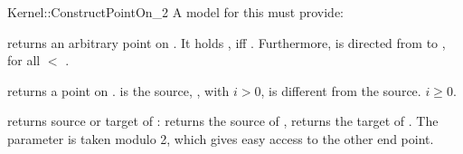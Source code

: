 \begin{ccRefFunctionObjectConcept}{Kernel::ConstructPointOn_2}
A model for this must provide:


       {returns an arbitrary point on . It holds 
        , iff .
        Furthermore,  is directed from 
        to , for all  $<$ .}

       {returns a point on .  is the source,
        , with $i>0$, is different from the 
        source. \ccPrecond $i \geq 0$.}

       {returns source or target   of :    returns
        the source of ,  returns the target of .
        The parameter  is taken modulo 2, which gives 
        easy access to the other end point. }

\ccSeeAlso
{} \\
 \\
 \\

\end{ccRefFunctionObjectConcept}
